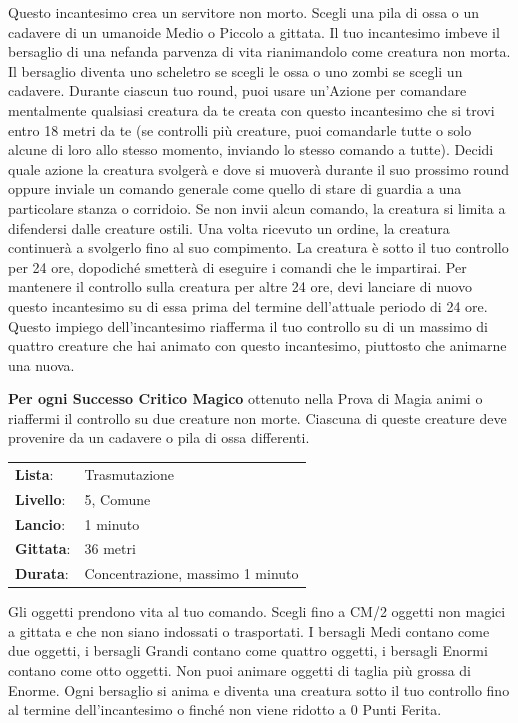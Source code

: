 \begin{multicols}{2}
Questo incantesimo crea un servitore non morto. Scegli una pila di ossa o un cadavere di un umanoide Medio o Piccolo a gittata. Il tuo incantesimo imbeve il bersaglio di una nefanda parvenza di vita rianimandolo come creatura non morta. Il bersaglio diventa uno scheletro se scegli le ossa o uno zombi se scegli un cadavere. Durante ciascun tuo round, puoi usare un'Azione per comandare mentalmente qualsiasi creatura da te creata con questo incantesimo che si trovi entro 18 metri da te (se controlli più creature, puoi comandarle tutte o solo alcune di loro allo stesso momento, inviando lo stesso comando a tutte). Decidi quale azione la creatura svolgerà e dove si muoverà durante il suo prossimo round oppure inviale un comando generale come quello di stare di guardia a una particolare stanza o corridoio. Se non invii alcun comando, la creatura si limita a difendersi dalle creature ostili. Una volta ricevuto un ordine, la creatura continuerà a svolgerlo fino al suo compimento. La creatura è sotto il tuo controllo per 24 ore, dopodiché smetterà di eseguire i comandi che le impartirai. Per mantenere il controllo sulla creatura per altre 24 ore, devi lanciare di nuovo questo incantesimo su di essa prima del termine dell'attuale periodo di 24 ore. Questo impiego dell'incantesimo riafferma il tuo controllo su di un massimo di quattro creature che hai animato con questo incantesimo, piuttosto che animarne una nuova.

\textbf{Per ogni Successo Critico Magico} ottenuto nella Prova di Magia animi o riaffermi il controllo su due creature non morte. Ciascuna di queste creature deve provenire da un cadavere o pila di ossa differenti.

\noindent\begin{tabularx}{\linewidth}{p{1.3cm}X}
	\rowcolor{gray!20}\textbf{Lista}: & Trasmutazione \\
	\textbf{Livello}: & 5, Comune \\
	\rowcolor{gray!20}\textbf{Lancio}: & 1 minuto \\
	\textbf{Gittata}: & 36 metri \\
	\rowcolor{gray!20}\textbf{Durata}: & Concentrazione, massimo 1 minuto \\
\end{tabularx}\smallskip

\label{Animate Object}Gli oggetti prendono vita al tuo comando. Scegli fino a CM/2 oggetti non magici a gittata e che non siano indossati o trasportati. I bersagli Medi contano come due oggetti, i bersagli Grandi contano come quattro oggetti, i bersagli Enormi contano come otto oggetti. Non puoi animare oggetti di taglia più grossa di Enorme. Ogni bersaglio si anima e diventa una creatura sotto il tuo controllo fino al termine dell'incantesimo o finché non viene ridotto a 0 Punti Ferita.


\end{multicols}
